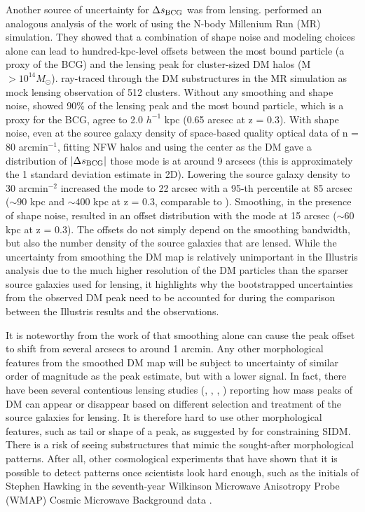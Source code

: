 Another source of uncertainty for $\Delta s_{\rm BCG}$ was from lensing. 
\cite{Dietrich2012} performed an analogous analysis of the work of \cite{Oguri2010} 
using the N-body Millenium Run (MR) simulation.
They showed that a combination of shape noise and modeling choices 
alone can lead to hundred-kpc-level offsets between the most bound particle 
(a proxy of the BCG) and the lensing peak for cluster-sized DM halos 
(M $> 10^{14 }M_\odot$).  
\cite{Dietrich2012} ray-traced through the DM substructures in the MR simulation 
as mock lensing observation of 512 clusters.  
Without any smoothing and shape noise, \cite{Dietrich2012} showed 
90\% of the lensing peak and the 
most bound particle, which is a proxy for the BCG, agree to 2.0 $h^{-1}$ kpc
(0.65 arcsec at z = 0.3). 
With shape noise,
even at the source galaxy density of space-based quality optical data of n = 80
arcmin$^{-1}$, fitting NFW halos and using the center as the DM gave a 
distribution of $|\Delta s_{\rm BCG}|$ those mode is at around 9 arcsecs (this is
approximately the 1 standard deviation estimate in 2D). 
Lowering the source galaxy density to 30 arcmin$^{-2}$ increased the mode
to 22 arcsec with a 95-th percentile at 85 arcsec 
($\sim 90$ kpc and $\sim 400$ kpc at z = 0.3, comparable to \citealt{Oguri2010}). 
Smoothing, in the presence of shape noise,
resulted in an offset distribution with the mode at
15 arcsec ($\sim 60$ kpc at z = 0.3). 
The offsets do not simply depend on the smoothing bandwidth, 
but also the number density of the source galaxies that are lensed. 
While the uncertainty from smoothing the DM map is
relatively unimportant in the Illustris analysis due to the much higher resolution 
of the DM particles than the sparser source galaxies used for lensing, it
highlights why the bootstrapped uncertainties from the observed
DM peak need to be accounted for during the comparison between the
Illustris results and the observations.

It is noteworthy from the work of \cite{Dietrich2012} that 
smoothing alone can cause the peak offset to shift from several arcsecs to
around 1 arcmin.
Any other morphological features from the smoothed DM map will be subject 
to uncertainty of similar order of magnitude as the peak
estimate, but with a lower signal. 
In fact, there have been several contentious lensing studies (\citealt{Clowe2012},
\citealt{Jee2014b}, \citealt{Wittman2014}, \citealt{Cook2012})
reporting how mass peaks of DM can appear or disappear based on
different selection and treatment of the source galaxies for lensing. 
It is therefore hard to use other morphological features, such as tail or shape 
of a peak,
as suggested by \cite{Kahlhoefer14} for constraining SIDM.
There is a risk of seeing substructures that mimic the sought-after 
morphological patterns. After all, other cosmological experiments 
that have shown
that it is possible to detect patterns once scientists look hard enough, 
such as the initials of Stephen
Hawking in the seventh-year Wilkinson Microwave Anisotropy Probe (WMAP) 
Cosmic Microwave Background data \citep{Bennett2011}.

